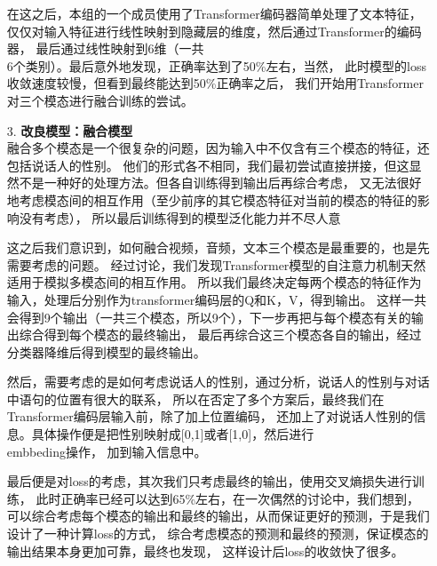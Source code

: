 \documentclass[11pt]{article}
\begin{document}
\begin{enumerate}
                在这之后，本组的一个成员使用了Transformer编码器简单处理了文本特征，
                仅仅对输入特征进行线性映射到隐藏层的维度，然后通过Transformer的编码器，
                最后通过线性映射到6维（一共\\6个类别）。最后意外地发现，正确率达到了50\%左右，当然，
                此时模型的loss收敛速度较慢，但看到最终能达到50\%正确率之后，
                我们开始用Transformer对三个模态进行融合训练的尝试。
                
                \item [3. ]\textbf{改良模型：融合模型}\\
                
                融合多个模态是一个很复杂的问题，因为输入中不仅含有三个模态的特征，还包括说话人的性别。
                他们的形式各不相同，我们最初尝试直接拼接，但这显然不是一种好的处理方法。但各自训练得到输出后再综合考虑，
                又无法很好地考虑模态间的相互作用（至少前序的其它模态特征对当前的模态的特征的影响没有考虑），
                所以最后训练得到的模型泛化能力并不尽人意

                这之后我们意识到，如何融合视频，音频，文本三个模态是最重要的，也是先需要考虑的问题。
                经过讨论，我们发现Transformer模型的自注意力机制天然适用于模拟多模态间的相互作用。
                所以我们最终决定每两个模态的特征作为输入，处理后分别作为transformer编码层的Q和K，V，得到输出。
                这样一共会得到9个输出（一共三个模态，所以9个），下一步再把与每个模态有关的输出综合得到每个模态的最终输出，
                最后再综合这三个模态各自的输出，经过分类器降维后得到模型的最终输出。
                
                然后，需要考虑的是如何考虑说话人的性别，通过分析，说话人的性别与对话中语句的位置有很大的联系，
                所以在否定了多个方案后，最终我们在Transformer编码层输入前，除了加上位置编码，
                还加上了对说话人性别的信息。具体操作便是把性别映射成[0,1]或者[1,0]，然后进行\\embbeding操作，
                加到输入信息中。
                
                最后便是对loss的考虑，其次我们只考虑最终的输出，使用交叉熵损失进行训练，
                此时正确率已经可以达到65\%左右，在一次偶然的讨论中，我们想到，
                可以综合考虑每个模态的输出和最终的输出，从而保证更好的预测，于是我们设计了一种计算loss的方式，
                综合考虑模态的预测和最终的预测，保证模态的输出结果本身更加可靠，最终也发现，
                这样设计后loss的收敛快了很多。

            \end{enumerate}
\end{document}
